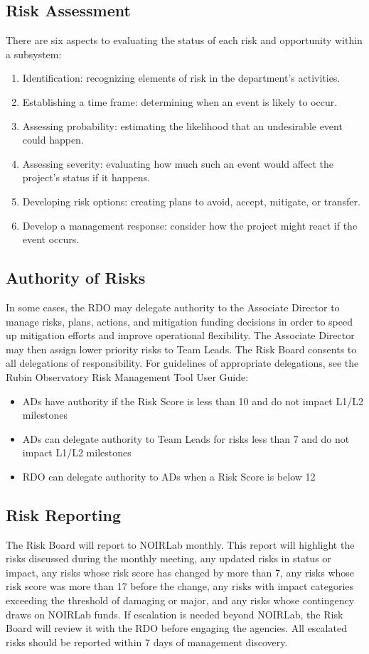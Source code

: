 \subsection{Risk Assessment}

There are six aspects to evaluating the status of each risk and opportunity within a subsystem:
\begin{enumerate}
\item Identification: recognizing elements of risk in the department’s activities.
\item Establishing a time frame: determining when an event is likely to occur.
\item Assessing probability: estimating the likelihood that an undesirable event could happen.
\item Assessing severity: evaluating how much such an event would affect the project's status if it happens.
\item Developing risk options: creating plans to avoid, accept, mitigate, or transfer.
\item Develop a management response: consider how the project might react if the event occurs.
\end{enumerate}

\subsection{Authority of Risks}

In some cases, the RDO may delegate authority to the Associate Director to manage risks, plans, actions, and mitigation funding decisions in order to speed up mitigation efforts and improve operational flexibility. The Associate Director may then assign lower priority risks to Team Leads. The Risk Board consents to all delegations of responsibility. 
For guidelines of appropriate delegations, see the Rubin Observatory Risk Management Tool User Guide:
\begin{itemize}
	\item AD\textquotesingle s have authority if the Risk Score is less than 10 and do not impact L1\slash L2 milestones
	\item AD\textquotesingle s can delegate authority to Team Leads for risks less than 7 and do not impact L1\slash L2 milestones
	\item RDO can delegate authority to AD\textquotesingle s when a Risk Score is below 12
	
\end{itemize}

\subsection{Risk Reporting}
The Risk Board will report to NOIRLab monthly. This report will highlight the risks discussed during the monthly meeting, any updated risks in status or impact, any risks whose risk score has changed by more than 7, any risks whose risk score was more than 17 before the change, any risks with impact categories exceeding the threshold of damaging or major, and any risks whose contingency draws on NOIRLab funds. If escalation is needed beyond NOIRLab, the Risk Board will review it with the RDO before engaging the agencies. All escalated risks should be reported within 7 days of management discovery.
